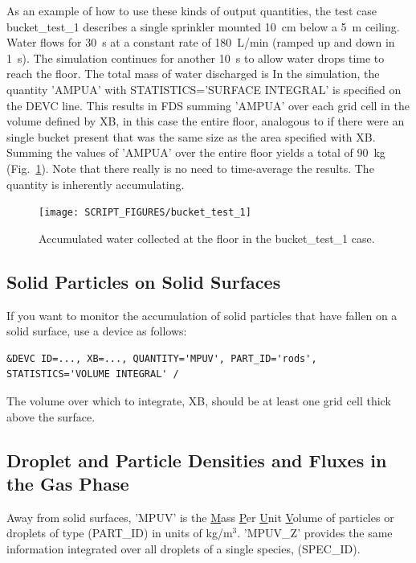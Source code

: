 \documentclass[11pt]{book}
\begin{document}
As an example of how to use these kinds of output quantities, the test case {\ct bucket\_test\_1} describes a single sprinkler mounted 10~cm below a 5~m ceiling. Water flows for 30~s at a constant rate of 180~L/min (ramped up and down in 1~s).  The simulation continues for another 10~s to allow water drops time to reach the floor. The total mass of water discharged is
\be
\ee
In the simulation, the quantity {\ct 'AMPUA'} with {\ct STATISTICS='SURFACE INTEGRAL'} is specified on the {\ct DEVC} line.  This results in FDS summing {\ct 'AMPUA'} over each grid cell in the volume defined by {\ct XB}, in this case the entire floor, analogous to if there were an single bucket present that was the same size as the area specified with {\ct XB}. Summing the values of {\ct 'AMPUA'} over the entire floor yields a total of 90~kg (Fig.~\ref{bucket_test_fig}). Note that there really is no need to time-average the results. The quantity is inherently accumulating.

\begin{figure}[ht]
\centering
\texttt{[image: SCRIPT\_FIGURES/bucket\_test\_1]}
\caption[Results of the {\ct bucket\_test\_1} case]{Accumulated water collected at the floor in the {\ct bucket\_test\_1} case.}
\label{bucket_test_fig}
\end{figure}


\subsection{Solid Particles on Solid Surfaces}

If you want to monitor the accumulation of solid particles that have fallen on a solid surface, use a device as follows:
\begin{lstlisting}
&DEVC ID=..., XB=..., QUANTITY='MPUV', PART_ID='rods', STATISTICS='VOLUME INTEGRAL' /
\end{lstlisting}
The volume over which to integrate, {\ct XB}, should be at least one grid cell thick above the surface.


\subsection{Droplet and Particle Densities and Fluxes in the Gas Phase}
\label{bucket_test_4}

Away from solid surfaces, {\ct 'MPUV'} is the \underline{M}ass \underline{P}er \underline{U}nit \underline{V}olume of particles or droplets of type ({\ct PART\_ID}) in units of kg/m$^3$.  {\ct 'MPUV\_Z'} provides the same information integrated over all droplets of a single species, ({\ct SPEC\_ID}).
\end{document}
